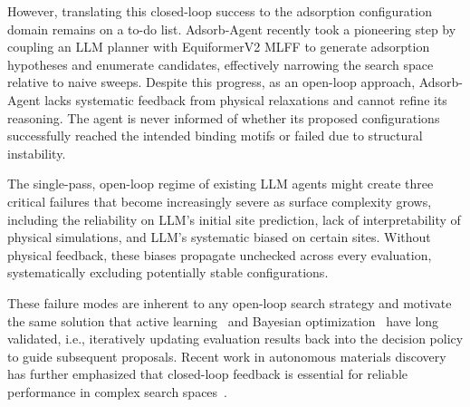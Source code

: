 However, translating this closed-loop success to the adsorption configuration domain remains on a to-do list. Adsorb-Agent \cite{ock2026adsorbagent} recently took a pioneering step by coupling an LLM planner with EquiformerV2 \cite{liao2024equiformerv2} MLFF to generate adsorption hypotheses and enumerate candidates, effectively narrowing the search space relative to naive sweeps. Despite this progress, as an open-loop approach, Adsorb-Agent lacks systematic feedback from physical relaxations and cannot refine its reasoning.
The agent is never informed of whether its proposed configurations successfully reached the intended binding motifs or failed due to structural instability. 

The single-pass, open-loop regime of existing LLM agents might create three critical failures that become increasingly severe as surface complexity grows, including the reliability on LLM's initial site prediction, lack of interpretability of physical simulations, and LLM's systematic biased on certain sites.
Without physical feedback, these biases propagate unchecked across every evaluation, systematically excluding potentially stable configurations.

These failure modes are inherent to any open-loop search strategy and motivate the same solution that active learning~\cite{settles2012active} and Bayesian optimization~\cite{snoek2012practical} have long validated, i.e., iteratively updating evaluation results back into the decision policy to guide subsequent proposals.
Recent work in autonomous materials discovery has further emphasized that closed-loop feedback is essential for reliable performance in complex search spaces~\cite{abolhasani2023rise,miret2025enabling}.

